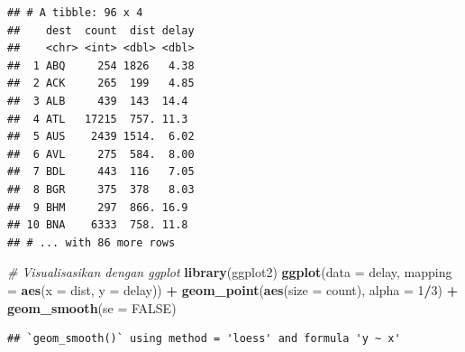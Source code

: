 \documentclass[]{book}
\newenvironment{Shaded}{\begin{snugshade}}{\end{snugshade}}
\newcommand{\KeywordTok}[1]{\textcolor[rgb]{0.13,0.29,0.53}{\textbf{#1}}}
\newcommand{\DataTypeTok}[1]{\textcolor[rgb]{0.13,0.29,0.53}{#1}}
\newcommand{\DecValTok}[1]{\textcolor[rgb]{0.00,0.00,0.81}{#1}}
\newcommand{\StringTok}[1]{\textcolor[rgb]{0.31,0.60,0.02}{#1}}
\newcommand{\CommentTok}[1]{\textcolor[rgb]{0.56,0.35,0.01}{\textit{#1}}}
\newcommand{\OtherTok}[1]{\textcolor[rgb]{0.56,0.35,0.01}{#1}}
\newcommand{\OperatorTok}[1]{\textcolor[rgb]{0.81,0.36,0.00}{\textbf{#1}}}
\newcommand{\NormalTok}[1]{#1}
\begin{document}
\begin{Shaded}
\end{Shaded}

\begin{verbatim}
## # A tibble: 96 x 4
##    dest  count  dist delay
##    <chr> <int> <dbl> <dbl>
##  1 ABQ     254 1826   4.38
##  2 ACK     265  199   4.85
##  3 ALB     439  143  14.4 
##  4 ATL   17215  757. 11.3 
##  5 AUS    2439 1514.  6.02
##  6 AVL     275  584.  8.00
##  7 BDL     443  116   7.05
##  8 BGR     375  378   8.03
##  9 BHM     297  866. 16.9 
## 10 BNA    6333  758. 11.8 
## # ... with 86 more rows
\end{verbatim}

\begin{Shaded}
\begin{Highlighting}[]
\CommentTok{# Visualisasikan dengan ggplot}
\KeywordTok{library}\NormalTok{(ggplot2)}
\KeywordTok{ggplot}\NormalTok{(}\DataTypeTok{data =}\NormalTok{ delay, }\DataTypeTok{mapping =} \KeywordTok{aes}\NormalTok{(}\DataTypeTok{x =}\NormalTok{ dist, }\DataTypeTok{y =}\NormalTok{ delay)) }\OperatorTok{+}
\KeywordTok{geom_point}\NormalTok{(}\KeywordTok{aes}\NormalTok{(}\DataTypeTok{size =}\NormalTok{ count), }\DataTypeTok{alpha =} \DecValTok{1}\OperatorTok{/}\DecValTok{3}\NormalTok{) }\OperatorTok{+}
\KeywordTok{geom_smooth}\NormalTok{(}\DataTypeTok{se =} \OtherTok{FALSE}\NormalTok{)}
\end{Highlighting}
\end{Shaded}

\begin{verbatim}
## `geom_smooth()` using method = 'loess' and formula 'y ~ x'
\end{verbatim}
\end{document}
